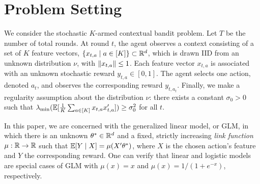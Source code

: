 \section{Problem Setting} \label{sec:probsetting} 

We consider the stochastic $K$-armed contextual bandit problem.  Let $T$ be the number of total rounds. At round $t$, the agent observes a context consisting of a set of $K$ feature vectors, $\{x_{t,a} \mid a\in[K]\} \subset \mathbb{R}^d$, which is drawn IID from an unknown distribution $\nu$, with $\left\|x_{t,a}\right\| \le 1$.  %
Each feature vector $x_{t,a}$ is associated with an unknown stochastic reward  $y_{t,a} \in [0,1]$.  The agent selects one action, denoted $a_t$, and observes the corresponding reward $y_{t,a_t}$.  Finally, we make a regularity assumption about the distribution $\nu$: there exists a constant $\sigma_0 > 0$ such that $\lambda_{\min}(\mathbb{E}[\frac{1}{K}\sum_{a\in[K]}x_{t,a}x_{t,a}']) \ge \sigma_0^2$ for all $t$.

In this paper, we are concerned with the generalized linear model, or GLM, in which there is an unknown $\theta^* \in \mathbb{R}^d$ and a fixed, strictly increasing \emph{link function} $\mu: \mathbb{R} \to \mathbb{R}$ such that $\mathbb{E}[Y \mid X] = \mu(X'\theta^*)$, where $X$ is the chosen action's feature and $Y$ the corresponding reward.
One can verify that linear and logistic models are special cases of GLM with $\mu(x)=x$ and $\mu(x)=1/(1+e^{-x})$, respectively. 

